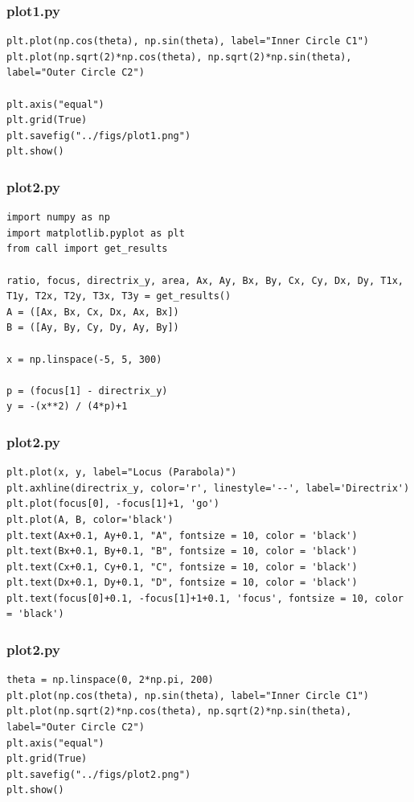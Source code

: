 \documentclass{beamer}
\begin{document}
\begin{frame}[fragile]
    \frametitle{plot1.py}
    \begin{lstlisting}
plt.plot(np.cos(theta), np.sin(theta), label="Inner Circle C1")
plt.plot(np.sqrt(2)*np.cos(theta), np.sqrt(2)*np.sin(theta), label="Outer Circle C2")

plt.axis("equal")
plt.grid(True)
plt.savefig("../figs/plot1.png")
plt.show()
    \end{lstlisting}
\end{frame}

\begin{frame}[fragile]
    \frametitle{plot2.py}
    \begin{lstlisting}
import numpy as np
import matplotlib.pyplot as plt
from call import get_results

ratio, focus, directrix_y, area, Ax, Ay, Bx, By, Cx, Cy, Dx, Dy, T1x, T1y, T2x, T2y, T3x, T3y = get_results()
A = ([Ax, Bx, Cx, Dx, Ax, Bx])
B = ([Ay, By, Cy, Dy, Ay, By])

x = np.linspace(-5, 5, 300)

p = (focus[1] - directrix_y)
y = -(x**2) / (4*p)+1
    \end{lstlisting}
\end{frame}

\begin{frame}[fragile]
    \frametitle{plot2.py}
    \begin{lstlisting}
plt.plot(x, y, label="Locus (Parabola)")
plt.axhline(directrix_y, color='r', linestyle='--', label='Directrix')
plt.plot(focus[0], -focus[1]+1, 'go')
plt.plot(A, B, color='black')
plt.text(Ax+0.1, Ay+0.1, "A", fontsize = 10, color = 'black')
plt.text(Bx+0.1, By+0.1, "B", fontsize = 10, color = 'black')
plt.text(Cx+0.1, Cy+0.1, "C", fontsize = 10, color = 'black')
plt.text(Dx+0.1, Dy+0.1, "D", fontsize = 10, color = 'black')
plt.text(focus[0]+0.1, -focus[1]+1+0.1, 'focus', fontsize = 10, color = 'black')
    \end{lstlisting}
\end{frame}

\begin{frame}[fragile]
    \frametitle{plot2.py}
    \begin{lstlisting}
theta = np.linspace(0, 2*np.pi, 200)
plt.plot(np.cos(theta), np.sin(theta), label="Inner Circle C1")
plt.plot(np.sqrt(2)*np.cos(theta), np.sqrt(2)*np.sin(theta), label="Outer Circle C2")
plt.axis("equal")
plt.grid(True)
plt.savefig("../figs/plot2.png")
plt.show()
    \end{lstlisting}
\end{frame}
\end{document}
